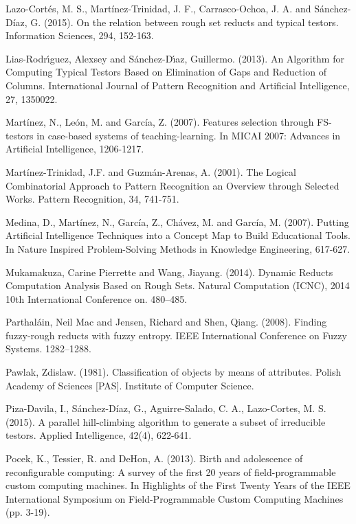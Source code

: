 \documentclass[authoryear,preprint,review,12pt]{elsarticle}
\begin{document}
\begin{thebibliography}{00}
Lazo-Cortés, M. S., Mart\'inez-Trinidad, J. F., Carrasco-Ochoa, J. A. and S\'anchez-D\'iaz, G. (2015). On the relation between rough set reducts and typical testors. Information Sciences, 294, 152-163.

Lias-Rodr\'{\i}guez, Alexsey and S\'{a}nchez-D\'{\i}az, Guillermo. (2013). An Algorithm for Computing Typical Testors Based on Elimination of Gaps and Reduction of Columns. International Journal of Pattern Recognition and Artificial Intelligence, 27, 1350022.

Mart\'inez, N., Le\'on, M. and Garc\'ia, Z. (2007). Features selection through FS-testors in case-based systems of teaching-learning. In MICAI 2007: Advances in Artificial Intelligence, 1206-1217.

Mart\'inez-Trinidad, J.F. and Guzm\'an-Arenas, A. (2001). The Logical Combinatorial Approach to Pattern Recognition an Overview through Selected Works. Pattern Recognition, 34, 741-751.
	
Medina, D., Mart\'inez, N., Garc\'ia, Z., Ch\'avez, M. and Garc\'ia, M. (2007). Putting Artificial Intelligence Techniques into a Concept Map to Build Educational Tools. In Nature Inspired Problem-Solving Methods in Knowledge Engineering, 617-627.

Mukamakuza, Carine Pierrette and Wang, Jiayang. (2014). Dynamic Reducts Computation Analysis Based on Rough Sets. Natural Computation (ICNC), 2014 10th International Conference on. 480--485.

Parthal\'{a}in, Neil Mac and Jensen, Richard and Shen, Qiang. (2008). Finding fuzzy-rough reducts with fuzzy entropy. IEEE International Conference on Fuzzy Systems. 1282--1288.

 Pawlak, Zdislaw. (1981). Classification of objects by means of attributes. Polish Academy of Sciences [PAS]. Institute of Computer Science.

Piza-Davila, I., S\'anchez-D\'iaz, G., Aguirre-Salado, C. A., Lazo-Cortes, M. S. (2015). A parallel hill-climbing algorithm to generate a subset of irreducible testors. Applied Intelligence, 42(4), 622-641.

Pocek, K., Tessier, R. and DeHon, A. (2013). Birth and adolescence of reconfigurable computing: A survey of the first 20 years of field-programmable custom computing machines. In Highlights of the First Twenty Years of the IEEE International Symposium on Field-Programmable Custom Computing Machines (pp. 3-19).


\end{thebibliography}
\end{document}
